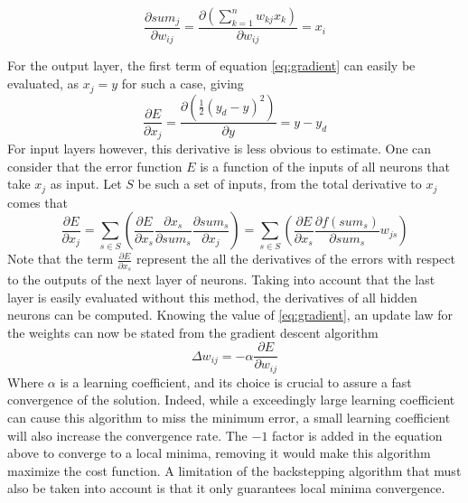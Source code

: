 \begin{equation}
\frac{\partial sum_j}{\partial w_{ij}} = \frac{\partial \left(\sum ^n_{k=1} w_{kj} x_k\right)}{\partial w_{ij}} = x_i
\end{equation}

For the output layer, the first term of equation \ref{eq:gradient} can easily be evaluated, as $x_j=y$ for such a case, giving
\begin{equation}
\frac{\partial E}{\partial x_j}=\frac{\partial (\frac{1}{2} (y_d-y)^2)}{\partial y}= y-y_d
\end{equation}
For input layers however, this derivative is less obvious to estimate. One can consider that the error function $E$ is a function of the inputs of all neurons that take $x_j$ as input. Let $S$ be such a set of inputs, from the total derivative to $x_j$ comes that
\begin{equation}
\frac{\partial E}{\partial x_j} = \sum _{s\in S}\left( \frac{\partial E}{\partial x_s}\frac{\partial x_s}{\partial sum_s}\frac{\partial sum_s}{\partial x_j}\right)=\sum _{s\in S}\left( \frac{\partial E}{\partial x_s}\frac{\partial f(sum_s)}{\partial sum_s}w_{js}\right)
\end{equation}
Note that the term $ \frac{\partial E}{\partial x_s} $ represent the all the derivatives of the errors with respect to the outputs of the next layer of neurons. Taking into account that the last layer is easily evaluated without this method, the derivatives of all hidden neurons can be computed. Knowing the value of \ref{eq:gradient}, an update law for the weights can now be stated from the gradient descent algorithm
\begin{equation}\label{eq:update_law}
\Delta w_{ij} = - \alpha \frac{\partial E}{\partial w_{ij}}
\end{equation}
Where $\alpha$ is a learning coefficient, and its choice is crucial to assure a fast convergence of the solution. Indeed, while a exceedingly large learning coefficient can cause this algorithm to miss the minimum error, a small learning coefficient will also increase the convergence rate. The $-1$ factor is added in the equation above to converge to a local minima, removing it would make this algorithm maximize the cost function. A limitation of the backstepping algorithm that must also be taken into account is that it only guarantees local minima convergence. 

